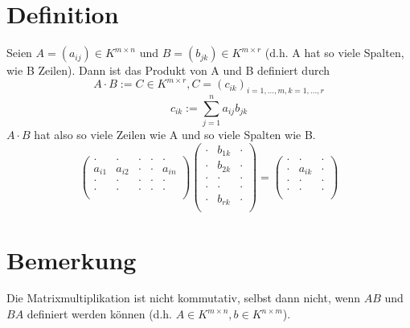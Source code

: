 \documentclass{scrbook}
\begin{document}
\section{Definition}
Seien $A=(a_{ij})\in K^{m \times n}$ und $B=(b_{jk})\in K^{m \times r}$ (d.h. A hat so viele Spalten, wie B Zeilen). Dann ist das Produkt von A und B definiert durch
\[
A\cdot B := C \in K^{m\times r}, C=(c_{ik})_{i=1,...,m,k=1,...,r}
\]
\[
c_{ik} := \sum^n_{j=1}a_{ij}b_{jk}
\]
$A\cdot B$ hat also so viele Zeilen wie A und so viele Spalten wie B.
\[
\left(
\begin{array}{ccccc}
\cdot&\cdot&\cdot&\cdot&\cdot\\
a_{i1}&a_{i2}&\cdot&\cdot&a_{in}\\
\cdot&\cdot&\cdot&\cdot&\cdot\\
\cdot&\cdot&\cdot&\cdot&\cdot\\
\end{array}
\right) 
\left(
\begin{array}{ccc}
\cdot&b_{1k}&\cdot\\
\cdot&b_{2k}&\cdot\\
\cdot&\cdot&\cdot\\
\cdot&\cdot&\cdot\\
\cdot&b_{rk}&\cdot\\
\end{array}
\right)=\left(
\begin{array}{ccc}
\cdot&\cdot&\cdot\\
\cdot&a_{ik}&\cdot\\
\cdot&\cdot&\cdot\\
\cdot&\cdot&\cdot\\
\end{array}
\right)
\]
\section{Bemerkung}
Die Matrixmultiplikation ist nicht kommutativ, selbst dann nicht, wenn $AB$ und $BA$ definiert werden können (d.h. $A\in K^{m\times n}, b\in K^{n\times m}$).
\end{document}
